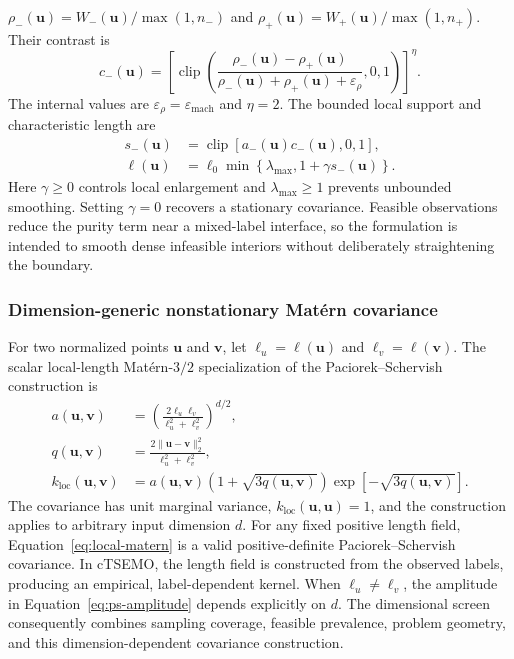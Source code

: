 \documentclass[twoside]{article}
\newcommand{\clip}{\operatorname{clip}}
\begin{document}
\(\rho_-(\mathbf{u})=W_-(\mathbf{u})/\max(1,n_-)\) and
\(\rho_+(\mathbf{u})=W_+(\mathbf{u})/\max(1,n_+)\). Their contrast is
\begin{equation}
  c_-(\mathbf{u})=
  \left[
  \clip\!\left(
  \frac{\rho_-(\mathbf{u})-\rho_+(\mathbf{u})}
       {\rho_-(\mathbf{u})+\rho_+(\mathbf{u})+\varepsilon_{\rho}},
  0,1\right)
  \right]^{\eta}.
  \label{eq:purity}
\end{equation}
The internal values are \(\varepsilon_{\rho}=\varepsilon_{\mathrm{mach}}\)
and \(\eta=2\).  The bounded local support and characteristic length are
\begin{align}
  s_-(\mathbf{u})&=\clip[a_-(\mathbf{u})c_-(\mathbf{u}),0,1],
  \label{eq:local-support}\\
  \ell(\mathbf{u})&=\ell_0
  \min\!\left\{\lambda_{\max},1+\gamma s_-(\mathbf{u})\right\}.
  \label{eq:local-length}
\end{align}
Here \(\gamma\geq0\) controls local enlargement and
\(\lambda_{\max}\geq1\) prevents unbounded smoothing.  Setting
\(\gamma=0\) recovers a stationary covariance.  Feasible observations reduce
the purity term near a mixed-label interface, so the formulation is intended
to smooth dense infeasible interiors without deliberately straightening the
boundary.

\subsubsection{Dimension-generic nonstationary Mat\'ern covariance}

For two normalized points \(\mathbf{u}\) and \(\mathbf{v}\), let
\(\ell_u=\ell(\mathbf{u})\) and \(\ell_v=\ell(\mathbf{v})\).  The scalar
local-length Mat\'ern-\(3/2\) specialization of the
Paciorek--Schervish construction is \cite{paciorek2004nonstationary}
\begin{align}
  a(\mathbf{u},\mathbf{v})
  &=
  \left(
  \frac{2\ell_u\ell_v}{\ell_u^2+\ell_v^2}
  \right)^{d/2},
  \label{eq:ps-amplitude}\\
  q(\mathbf{u},\mathbf{v})
  &=
  \frac{2\|\mathbf{u}-\mathbf{v}\|_2^2}
       {\ell_u^2+\ell_v^2},
  \label{eq:ps-distance}\\
  k_{\mathrm{loc}}(\mathbf{u},\mathbf{v})
  &=
  a(\mathbf{u},\mathbf{v})
  \left(1+\sqrt{3q(\mathbf{u},\mathbf{v})}\right)
  \exp\!\left[-\sqrt{3q(\mathbf{u},\mathbf{v})}\right].
  \label{eq:local-matern}
\end{align}
The covariance has unit marginal variance,
\(k_{\mathrm{loc}}(\mathbf{u},\mathbf{u})=1\), and the construction applies to
arbitrary input dimension \(d\). For any fixed positive length field,
Equation~\eqref{eq:local-matern} is a valid positive-definite
Paciorek--Schervish covariance. In cTSEMO, the length field is constructed from
the observed labels, producing an empirical, label-dependent kernel. When
\(\ell_u\ne\ell_v\), the amplitude in
Equation~\eqref{eq:ps-amplitude} depends explicitly on \(d\). The dimensional
screen consequently combines sampling coverage, feasible prevalence, problem
geometry, and this dimension-dependent covariance construction.
\end{document}
